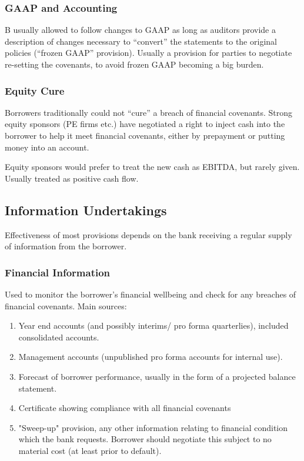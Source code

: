 \documentclass[
]{article}
\providecommand{\tightlist}{%
  \setlength{\itemsep}{0pt}\setlength{\parskip}{0pt}}
\begin{document}
\hypertarget{gaap-and-accounting}{%
\subsubsection{GAAP and Accounting}\label{gaap-and-accounting}}

B usually allowed to follow changes to GAAP as long as auditors provide
a description of changes necessary to ``convert'' the statements to the
original policies (``frozen GAAP'' provision). Usually a provision for
parties to negotiate re-setting the covenants, to avoid frozen GAAP
becoming a big burden.

\hypertarget{equity-cure}{%
\subsubsection{Equity Cure}\label{equity-cure}}

Borrowers traditionally could not ``cure'' a breach of financial
covenants. Strong equity sponsors (PE firms etc.) have negotiated a
right to inject cash into the borrower to help it meet financial
covenants, either by prepayment or putting money into an account.

Equity sponsors would prefer to treat the new cash as EBITDA, but rarely
given. Usually treated as positive cash flow.

\hypertarget{information-undertakings}{%
\subsection{Information Undertakings}\label{information-undertakings}}

Effectiveness of most provisions depends on the bank receiving a regular
supply of information from the borrower.

\hypertarget{financial-information}{%
\subsubsection{Financial Information}\label{financial-information}}

Used to monitor the borrower's financial wellbeing and check for any
breaches of financial covenants. Main sources:

\begin{enumerate}
\tightlist
\item
  Year end accounts (and possibly interims/ pro forma quarterlies),
  included consolidated accounts.
\item
  Management accounts (unpublished pro forma accounts for internal use).
\item
  Forecast of borrower performance, usually in the form of a projected
  balance statement.
\item
  Certificate showing compliance with all financial covenants
\item
  "Sweep-up" provision, any other information relating to financial
  condition which the bank requests. Borrower should negotiate this
  subject to no material cost (at least prior to default).
\end{enumerate}
\end{document}
